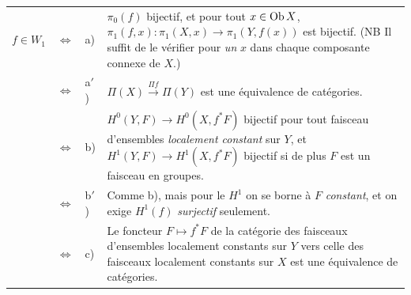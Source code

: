 \noindent\begin{tabular}{@{}l c l >{\RaggedRight\arraybackslash}p{}@{}}
$f \in W_1$ & $\Longleftrightarrow$ & a) & $\pi_0(f)$ bijectif, et pour tout $x \in \mathrm{Ob}\, X$, $\pi_1(f,x) : \pi_1(X,x) \longrightarrow \pi_1(Y,f(x))$ est bijectif. (NB Il suffit de le vérifier pour \textit{un} $x$ dans chaque composante connexe de $X$.)\\
 & $\Longleftrightarrow$ & a$'$) & $\Pi(X) \xrightarrow{\Pi f} \Pi(Y)$ est une équivalence de catégories.\\
 & $\Longleftrightarrow$ & b) & $H^0(Y,F) \longrightarrow H^0(X,f^*F)$ bijectif pour tout faisceau d'ensembles \textit{localement constant} sur $Y$, et $H^1(Y,F) \longrightarrow H^1(X,f^*F)$ bijectif si de plus $F$ est un faisceau en groupes.\\
 & $\Longleftrightarrow$ & b$'$) & Comme b), mais pour le $H^1$ on se borne à $F$ \textit{constant}, et on exige $H^1(f)$ \textit{surjectif} seulement.\\
 & $\Longleftrightarrow$ & c) & Le foncteur $F \longmapsto f^*F$ de la catégorie des faisceaux d'ensembles localement constants sur $Y$ vers celle des faisceaux localement constants sur $X$ est une équivalence de catégories.
\end{tabular}

\clearpage



